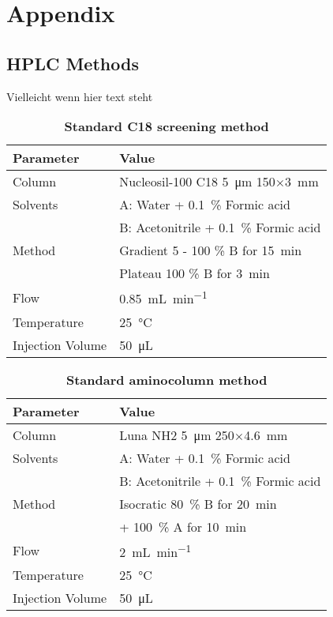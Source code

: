 \appendix
\chapter{Appendix}

\section{HPLC Methods} %
\label{sec:hplc_methods}

	Vielleicht wenn hier text steht

	\begin{table}[htbp]
		\caption[Standard C18 screening method]{\textbf{Standard C18 screening method}}
		\label{tab:method_c18_screening}
		\centering
		\begin{tabularx}{\textwidth}{XX}
			\toprule
			\textbf{Parameter}	& \textbf{Value}	\\
			\midrule
			Column 		& Nucleosil-100 C18 \SI{5}{\micro\meter} 150$\times$\SI{3}{\milli\meter} 	\\
			Solvents	& A: Water + 0.1~\% Formic acid 	\\
						& B: Acetonitrile + 0.1~\% Formic acid		\\
			Method 		& Gradient 5 - 100 \% B for \SI{15}{\minute} 	\\
						& Plateau 100 \% B for \SI{3}{\minute} 	\\
			Flow 		& \SI{0.85}{\milli\liter\per\minute} \\
			Temperature & \SI{25}{\celsius} 	\\
			Injection Volume 	& \SI{50}{\micro\liter} 	\\
			\bottomrule
		\end{tabularx}
	\end{table}

	\begin{table}[htbp]
		\caption[Standard aminocolumn method]{\textbf{Standard aminocolumn method}}
		\label{tab:method_nh2_standard}
		\centering
		\begin{tabularx}{\textwidth}{XX}
			\toprule
			\textbf{Parameter}	& \textbf{Value}	\\
			\midrule
			Column 		& Luna NH2 \SI{5}{\micro\meter} 250$\times$\SI{4.6}{\milli\meter} 	\\
			Solvents	& A: Water + 0.1~\% Formic acid 	\\
						& B: Acetonitrile + 0.1~\% Formic acid		\\
			Method 		& Isocratic 80~\% B for \SI{20}{\minute} 	\\
						& + 100~\% A for \SI{10}{\minute}   \\
			Flow 		& \SI{2}{\milli\liter\per\minute} \\
			Temperature & \SI{25}{\celsius} 	\\
			Injection Volume 	& \SI{50}{\micro\liter} 	\\
			\bottomrule
		\end{tabularx}
	\end{table}

